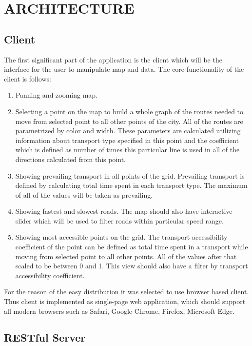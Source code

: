 
\section{ ARCHITECTURE }
\subsection{ Client }

The first significant part of the application is the client which will
be the interface for the user to manipulate map and data. The core functionality of the client
is follows:

\begin{enumerate}
  \item Panning and zooming map.
  \item Selecting a point on the map to build a whole graph of
  the routes needed to move from selected point to all other points of the city. All of the routes
  are parametrized by color and width. These parameters are calculated utilizing information
  about transport type specified in this point and the coefficient which is defined as number of
  times this particular line is used in all of the directions calculated from this point.
  \item Showing prevailing transport in all points of the grid. Prevailing transport is defined
  by calculating total time spent in each transport type. The maximum of all of the values will
  be taken as prevailing.
  \item Showing fastest and slowest roads. The map should also have interactive slider
  which will be used to filter roads within particular speed range.
  \item Showing most accessible points on the grid. The transport accessibility coefficient of the
  point can be defined as total time spent in a transport while moving from selected point to all
  other points. All of the values after that scaled to be between 0 and 1. This view should also
  have a filter by transport accessibility coefficient.
\end{enumerate}

For the reason of the easy distribution it was selected to use browser based client. Thus
client is implemented as single-page web application, which should support all modern browsers such
as Safari, Google Chrome, Firefox, Microsoft Edge.

\subsection{ RESTful Server }

